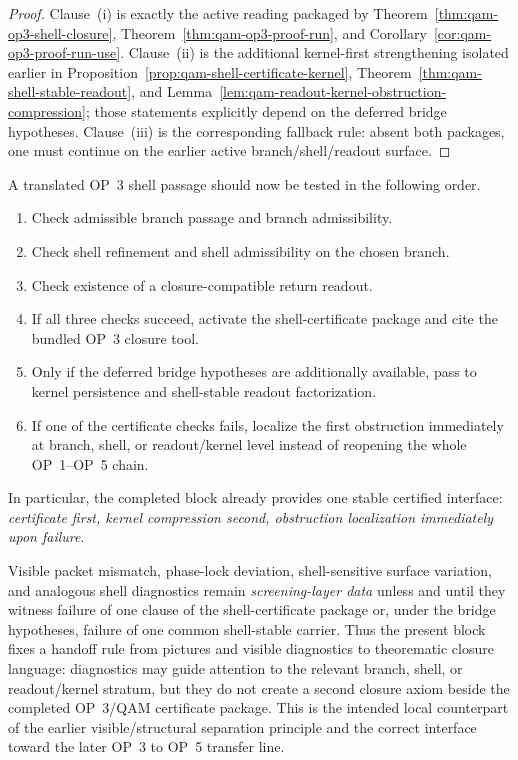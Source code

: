 \begin{proof}
Clause~(i) is exactly the active reading packaged by Theorem~\ref{thm:qam-op3-shell-closure}, Theorem~\ref{thm:qam-op3-proof-run}, and Corollary~\ref{cor:qam-op3-proof-run-use}. Clause~(ii) is the additional kernel-first strengthening isolated earlier in Proposition~\ref{prop:qam-shell-certificate-kernel}, Theorem~\ref{thm:qam-shell-stable-readout}, and Lemma~\ref{lem:qam-readout-kernel-obstruction-compression}; those statements explicitly depend on the deferred bridge hypotheses. Clause~(iii) is the corresponding fallback rule: absent both packages, one must continue on the earlier active branch/shell/readout surface.
\end{proof}

\begin{corollary}\label{cor:qam-op3-operational-checklist}
A translated OP~3 shell passage should now be tested in the following order.
\begin{enumerate}[leftmargin=2em]
 \item Check admissible branch passage and branch admissibility.
 \item Check shell refinement and shell admissibility on the chosen branch.
 \item Check existence of a closure-compatible return readout.
 \item If all three checks succeed, activate the shell-certificate package and cite the bundled OP~3 closure tool.
 \item Only if the deferred bridge hypotheses are additionally available, pass to kernel persistence and shell-stable readout factorization.
 \item If one of the certificate checks fails, localize the first obstruction immediately at branch, shell, or readout/kernel level instead of reopening the whole OP~1--OP~5 chain.
\end{enumerate}
In particular, the completed block already provides one stable certified interface: \emph{certificate first, kernel compression second, obstruction localization immediately upon failure}.
\end{corollary}

\begin{remark}\label{rem:qam-op3-diagnostic-handoff}
Visible packet mismatch, phase-lock deviation, shell-sensitive surface variation, and analogous shell diagnostics remain \emph{screening-layer data} unless and until they witness failure of one clause of the shell-certificate package or, under the bridge hypotheses, failure of one common shell-stable carrier. Thus the present block fixes a handoff rule from pictures and visible diagnostics to theorematic closure language: diagnostics may guide attention to the relevant branch, shell, or readout/kernel stratum, but they do not create a second closure axiom beside the completed OP~3/QAM certificate package. This is the intended local counterpart of the earlier visible/structural separation principle and the correct interface toward the later OP~3 to OP~5 transfer line.
\end{remark}

